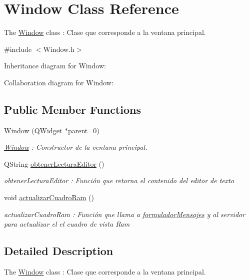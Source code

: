 \hypertarget{class_window}{}\section{Window Class Reference}
\label{class_window}


The \hyperlink{class_window}{Window} class \+: Clase que corresponde a la ventana principal.  




{\ttfamily \#include $<$Window.\+h$>$}



Inheritance diagram for Window\+:


Collaboration diagram for Window\+:
\subsection*{Public Member Functions}
\begin{DoxyCompactItemize}
\item 
\hyperlink{class_window_ab27fe44e0834066236f79f244b02f67e}{Window} (Q\+Widget $\ast$parent=0)
\begin{DoxyCompactList}\small\item\em \hyperlink{class_window}{Window} \+: Constructor de la ventana principal. \end{DoxyCompactList}\item 
Q\+String \hyperlink{class_window_a4d38598281de0e7265a88da4d6f85002}{obtener\+Lectura\+Editor} ()
\begin{DoxyCompactList}\small\item\em obtener\+Lectura\+Editor \+: Función que retorna el contenido del editor de texto \end{DoxyCompactList}\item 
void \hyperlink{class_window_a0587317f30c1cae7d5853579f1bec7c0}{actualizar\+Cuadro\+Ram} ()\hypertarget{class_window_a0587317f30c1cae7d5853579f1bec7c0}{}\label{class_window_a0587317f30c1cae7d5853579f1bec7c0}

\begin{DoxyCompactList}\small\item\em actualizar\+Cuadro\+Ram \+: Función que llama a \hyperlink{classformulador_mensajes}{formulador\+Mensajes} y al servidor para actualizar el el cuadro de vista Ram \end{DoxyCompactList}\end{DoxyCompactItemize}


\subsection{Detailed Description}
The \hyperlink{class_window}{Window} class \+: Clase que corresponde a la ventana principal. 

